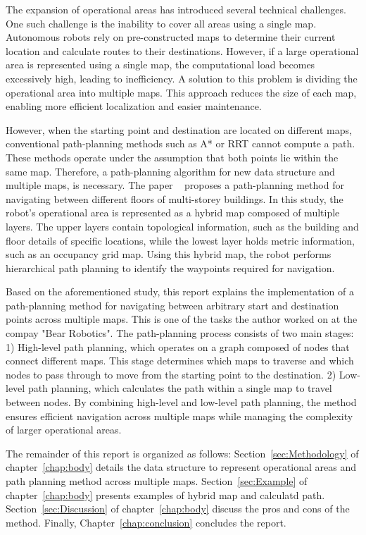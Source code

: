 \documentclass[en]{snu-cse-bsc-thesis}
\begin{document}
The expansion of operational areas has introduced several technical challenges. One such challenge is the inability to cover all areas using a single map. Autonomous robots rely on pre-constructed maps to determine their current location and calculate routes to their destinations. However, if a large operational area is represented using a single map, the computational load becomes excessively high, leading to inefficiency. A solution to this problem is dividing the operational area into multiple maps. This approach reduces the size of each map, enabling more efficient localization and easier maintenance. 

However, when the starting point and destination are located on different maps, conventional path-planning methods such as A* or RRT cannot compute a path. These methods operate under the assumption that both points lie within the same map. Therefore, a path-planning algorithm for new data structure and multiple maps, is necessary. The paper ~\cite{MultiStoreyBuildingNavigation} proposes a path-planning method for navigating between different floors of multi-storey buildings. In this study, the robot's operational area is represented as a hybrid map composed of multiple layers. The upper layers contain topological information, such as the building and floor details of specific locations, while the lowest layer holds metric information, such as an occupancy grid map. Using this hybrid map, the robot performs hierarchical path planning to identify the waypoints required for navigation.

Based on the aforementioned study, this report explains the implementation of a path-planning method for navigating between arbitrary start and destination points across multiple maps. This is one of the tasks the author worked on at the compay "Bear Robotics". The path-planning process consists of two main stages: 1) High-level path planning, which operates on a graph composed of nodes that connect different maps. This stage determines which maps to traverse and which nodes to pass through to move from the starting point to the destination. 2) Low-level path planning, which calculates the path within a single map to travel between nodes. By combining high-level and low-level path planning, the method ensures efficient navigation across multiple maps while managing the complexity of larger operational areas.

The remainder of this report is organized as follows:
Section~\ref{sec:Methodology} of chapter~\ref{chap:body} details the data structure to represent operational areas and path planning method across multiple maps. 
Section~\ref{sec:Example} of chapter~\ref{chap:body} presents examples of hybrid map and calculatd path.
Section~\ref{sec:Discussion} of chapter~\ref{chap:body} discuss the pros and cons of the method. 
Finally, Chapter~\ref{chap:conclusion} concludes the report.
\end{document}
